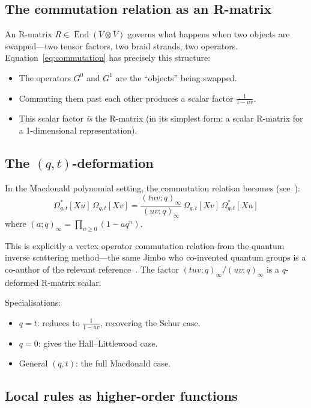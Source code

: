 \documentclass[12pt]{article}
\DeclareMathOperator{\End}{End}
\begin{document}
\subsection{The commutation relation as an R-matrix}

An R-matrix $R \in \End(V \otimes V)$ governs what happens when two objects
are swapped---two tensor factors, two braid strands, two operators.
Equation~\eqref{eq:commutation} has precisely this structure:

\begin{itemize}
  \item The operators $G^0$ and $G^1$ are the ``objects'' being swapped.
  \item Commuting them past each other produces a scalar factor
    $\frac{1}{1 - uv}$.
  \item This scalar factor \emph{is} the R-matrix (in its simplest form:
    a scalar R-matrix for a 1-dimensional representation).
\end{itemize}

\subsection{The $(q,t)$-deformation}

In the Macdonald polynomial setting, the commutation relation becomes
(see~\cite{GHT99, JimboMiwa1983}):
\begin{equation} \label{eq:qt-commutation}
  \Omega^*_{q,t}[Xu]\, \Omega_{q,t}[Xv]
    = \frac{(tuv; q)_\infty}{(uv; q)_\infty}\,
      \Omega_{q,t}[Xv]\, \Omega^*_{q,t}[Xu]
\end{equation}
where $(a;q)_\infty = \prod_{n \ge 0}(1 - aq^n)$.

This is explicitly a vertex operator commutation relation from the quantum
inverse scattering method---the same Jimbo who co-invented quantum groups
is a co-author of the relevant reference~\cite{JimboMiwa1983}. The factor
$(tuv;q)_\infty / (uv;q)_\infty$ is a $q$-deformed R-matrix scalar.

Specialisations:
\begin{itemize}
  \item $q = t$: reduces to $\frac{1}{1-uv}$, recovering the Schur case.
  \item $q = 0$: gives the Hall--Littlewood case.
  \item General $(q,t)$: the full Macdonald case.
\end{itemize}

\subsection{Local rules as higher-order functions}
\end{document}
